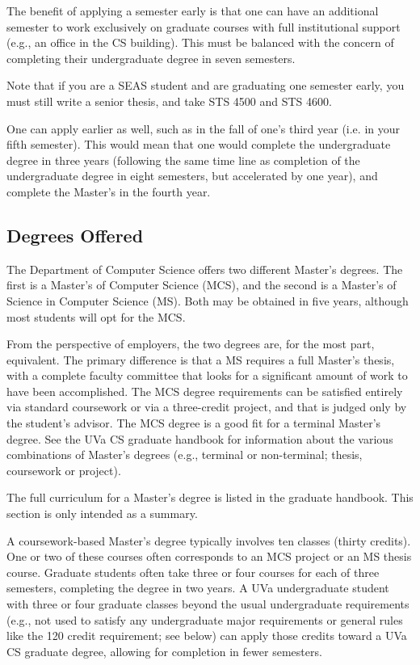 The benefit of applying a semester early is that one can have an
additional semester to work exclusively on graduate courses with full
institutional support (e.g., an office in the CS building). This must be
balanced with the concern of completing their undergraduate degree in seven
semesters.

Note that if you are a SEAS student and are graduating one semester
early, you must still write a senior thesis, and take STS 4500 and STS
4600.

One can apply earlier as well, such as in the fall of one's third year
(i.e. in your fifth semester).  This would mean that one would complete
the undergraduate degree in three years (following the same time line as
completion of the undergraduate degree in eight semesters, but accelerated
by one year), and complete the Master's in the fourth year.

\subsection{Degrees Offered}

The Department of Computer Science offers two different Master's
degrees.  The first is a Master's of Computer Science (MCS), and the
second is a Master's of Science in Computer Science (MS). Both may be
obtained in five years, although most students will opt for the MCS.

From the perspective of employers, the two degrees are, for the most part,
equivalent.  The primary difference is that a MS requires a full
Master's thesis, with a complete faculty committee that looks for a
significant amount of work to have been accomplished.  The MCS degree
requirements can be satisfied entirely via standard coursework or via
a three-credit project, and that is judged only by the student's advisor.
The MCS degree is a good fit for a terminal Master's degree. See the
UVa CS graduate handbook for information about the various combinations
of Master's degrees (e.g., terminal or non-terminal; thesis, coursework or
project). 


The full curriculum for a Master's degree is listed in the graduate
handbook.
This section is only intended as a summary.

A coursework-based Master's degree typically involves ten classes (thirty
credits). One or two of these courses often corresponds to an MCS project
or an MS thesis course.  Graduate students often take three or four courses
for each of three semesters, completing the degree in two years. A UVa
undergraduate student with three or four graduate classes beyond the usual
undergraduate requirements (e.g., not used to satisfy any undergraduate
major requirements or general rules like the 120 credit requirement; see
below) can apply those credits toward a UVa CS graduate degree, allowing
for completion in fewer semesters. 


